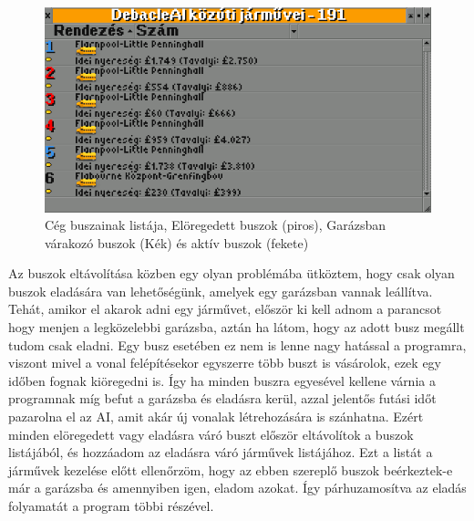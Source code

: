 \begin{figure}[h!]
	\centering
	\includegraphics[width=\textwidth]{images/buszok.png}
	\caption{Cég buszainak listája, Elöregedett buszok (piros), Garázsban várakozó buszok (Kék) és aktív buszok (fekete)}
	\label{fig:vonal}
\end{figure}

Az buszok eltávolítása közben egy olyan problémába ütköztem, hogy csak olyan buszok eladására van lehetőségünk, amelyek egy garázsban vannak leállítva. Tehát, amikor el akarok adni egy járművet, először ki kell adnom a parancsot hogy menjen a legközelebbi garázsba, aztán ha látom, hogy az adott busz megállt tudom csak eladni. Egy busz esetében ez nem is lenne nagy hatással a programra, viszont mivel a vonal felépítésekor egyszerre több buszt is vásárolok, ezek egy időben fognak kiöregedni is. Így ha minden buszra egyesével kellene várnia a programnak míg befut a garázsba és eladásra kerül, azzal jelentős futási időt pazarolna el az AI, amit akár új vonalak létrehozására is szánhatna. Ezért minden elöregedett vagy eladásra váró buszt először eltávolítok a buszok listájából, és hozzáadom az eladásra váró járművek listájához. Ezt a listát a járművek kezelése előtt ellenőrzöm, hogy az ebben szereplő buszok beérkeztek-e már a garázsba és amennyiben igen, eladom azokat. Így párhuzamosítva az eladás folyamatát a program többi részével.
